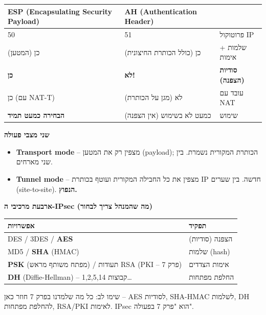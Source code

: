 \documentclass[11pt]{article}
\newcommand{\enLR}[1]{\textenglish{#1}}
\newcommand{\subheading}[1]{\vskip6pt{\bfseries\color{h3}#1\par}\vskip2pt}
\begin{document}
\begin{xltabular}{\linewidth}{|>{\setRTL\raggedleft\arraybackslash}X|>{\setRTL\raggedleft\arraybackslash}X|>{\setRTL\raggedleft\arraybackslash}X|}
\hline
{}\textbf{\enLR{ESP (Encapsulating Security Payload)}} & \textbf{\enLR{AH (Authentication Header)}} & \textbf{} \\
\hline
\endhead
\enLR{50} & \enLR{51} & פרוטוקול \enLR{IP} \\
\hline
כן (המטען) & כן (כולל הכותרת החיצונית) & שלמות + אימות \\
\hline
\textbf{כן} & \textbf{לא!} & \textbf{סודיות (הצפנה)} \\
\hline
כן (עם \enLR{NAT-T)} & לא (מגן על הכותרת) & עובד עם \enLR{NAT} \\
\hline
\textbf{הבחירה כמעט תמיד} & כמעט לא בשימוש (אין הצפנה) & שימוש \\
\hline
\end{xltabular}

\subheading{שני מצבי פעולה}

\begin{itemize}
\item \textbf{\enLR{Transport mode}} – מצפין רק את המטען \enLR{(payload)}; הכותרת המקורית נשמרת. בין שני מארחים.
\item \textbf{\enLR{Tunnel mode}} – מצפין את כל החבילה המקורית ועוטף בכותרת \enLR{IP} חדשה. בין שערים \enLR{(site-to-site).} \textbf{הנפוץ.}
\end{itemize}

\subheading{ארבעת מרכיבי ה-\enLR{IPsec} (מה שהמנהל צריך לבחור)}

\begin{xltabular}{\linewidth}{|>{\setRTL\raggedleft\arraybackslash}X|>{\setRTL\raggedleft\arraybackslash}X|}
\hline
{}\textbf{אפשרויות} & \textbf{תפקיד} \\
\hline
\endhead
\enLR{DES / 3DES} / \textbf{\enLR{AES}} & הצפנה (סודיות) \\
\hline
\enLR{MD5} / \textbf{\enLR{SHA}} \enLR{(HMAC)} & שלמות \enLR{(hash)} \\
\hline
\textbf{\enLR{PSK}} (מפתח משותף מראש) / תעודות \enLR{RSA (PKI} – פרק \enLR{7)} & אימות הצדדים \\
\hline
\textbf{\enLR{DH}} \enLR{(Diffie-Hellman)} – קבוצות \enLR{1,2,5,14}… & החלפת מפתחות \\
\hline
\end{xltabular}

שימו לב: כל מה שלמדנו בפרק \enLR{7} חוזר כאן – \enLR{AES} לסודיות, \enLR{SHA-HMAC} לשלמות, \enLR{DH} להחלפת מפתחות, \enLR{RSA/PKI} לאימות. \enLR{IPsec} הוא "פרק \enLR{7} בפעולה".\par
\end{document}
